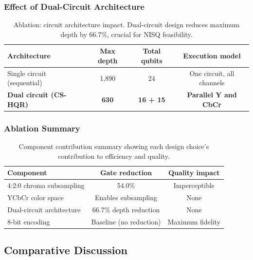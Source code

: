 \documentclass{ipol}
\newcommand{\cshqr}{\textsc{CS-HQR}}
\begin{document}
\FloatBarrier
\subsubsection{Effect of Dual-Circuit Architecture}

\begin{table}[H]
\begin{center}
\begin{tabular}{lccc}
\hline
Architecture & Max depth & Total qubits & Execution model \\
\hline
Single circuit (sequential) & 1,890 & 24 & One circuit, all channels \\
\rowcolor{green!15}
\textbf{Dual circuit (\cshqr)} & \textbf{630} & \textbf{16 + 15} & \textbf{Parallel Y and CbCr} \\
\hline
\end{tabular}
\caption{Ablation: circuit architecture impact. Dual-circuit design reduces
  maximum depth by 66.7\%, crucial for NISQ feasibility.}
\label{tab:ablation_architecture}
\end{center}
\end{table}

\FloatBarrier
\subsubsection{Ablation Summary}

\begin{table}[H]
\begin{center}
\begin{tabular}{lcc}
\hline
Component & Gate reduction & Quality impact \\
\hline
4:2:0 chroma subsampling & 54.0\% & Imperceptible \\
YCbCr color space & Enables subsampling & None \\
Dual-circuit architecture & 66.7\% depth reduction & None \\
8-bit encoding & Baseline (no reduction) & Maximum fidelity \\
\hline
\end{tabular}
\caption{Component contribution summary showing each design choice's
  contribution to efficiency and quality.}
\label{tab:ablation_summary}
\end{center}
\end{table}

\FloatBarrier
\subsection{Comparative Discussion}
\end{document}
